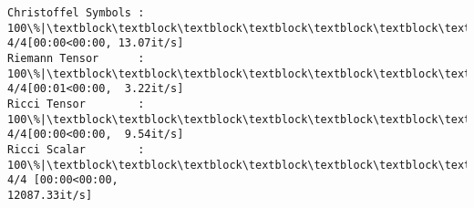 \documentclass[11pt]{article}
\newcommand{\prompt}[4]{
        {\ttfamily\llap{{\color{#2}[#3]:\hspace{3pt}#4}}\vspace{-\baselineskip}}
    }
\begin{document}
\begin{landscape}
    \begin{Verbatim}[commandchars=\\\{\}]
Christoffel Symbols : 100\%|\textblock\textblock\textblock\textblock\textblock\textblock\textblock\textblock\textblock\textblock\textblock\textblock\textblock\textblock\textblock\textblock\textblock\textblock\textblock\textblock\textblock\textblock\textblock\textblock\textblock\textblock\textblock\textblock\textblock\textblock\textblock\textblock\textblock\textblock\textblock| 4/4[00:00<00:00, 13.07it/s]
Riemann Tensor      : 100\%|\textblock\textblock\textblock\textblock\textblock\textblock\textblock\textblock\textblock\textblock\textblock\textblock\textblock\textblock\textblock\textblock\textblock\textblock\textblock\textblock\textblock\textblock\textblock\textblock\textblock\textblock\textblock\textblock\textblock\textblock\textblock\textblock\textblock\textblock\textblock| 4/4[00:01<00:00,  3.22it/s]
Ricci Tensor        : 100\%|\textblock\textblock\textblock\textblock\textblock\textblock\textblock\textblock\textblock\textblock\textblock\textblock\textblock\textblock\textblock\textblock\textblock\textblock\textblock\textblock\textblock\textblock\textblock\textblock\textblock\textblock\textblock\textblock\textblock\textblock\textblock\textblock\textblock\textblock\textblock| 4/4[00:00<00:00,  9.54it/s]
Ricci Scalar        : 100\%|\textblock\textblock\textblock\textblock\textblock\textblock\textblock\textblock\textblock\textblock\textblock\textblock\textblock\textblock\textblock\textblock\textblock\textblock\textblock\textblock\textblock\textblock\textblock\textblock\textblock\textblock\textblock\textblock\textblock\textblock\textblock\textblock| 4/4 [00:00<00:00,
12087.33it/s]
    \end{Verbatim}
 
            
\prompt{Out}{outcolor}{25}{}
    

\end{landscape}
\end{document}
